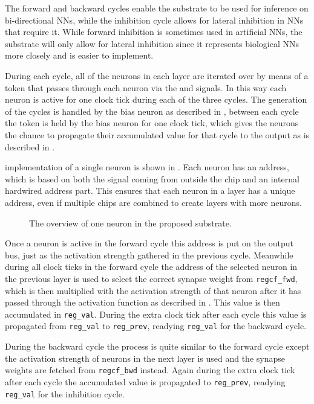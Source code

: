 The forward and backward cycles enable the substrate to be used for inference on bi-directional \acp{NN}, while the inhibition cycle allows for lateral inhibition in \acp{NN} that require it. While forward inhibition is sometimes used in artificial \acp{NN}, the substrate will only allow for lateral inhibition since it represents biological \acp{NN} more closely and is easier to implement.

During each cycle, all of the neurons in each layer are iterated over by means of a token that passes through each neuron via the  and  signals. In this way each neuron is active for one clock tick during each of the three cycles. The generation of the cycles is handled by the bias neuron as described in , between each cycle the token is held by the bias neuron for one clock tick, which gives the neurons the chance to propagate their accumulated value for that cycle to the output as is described in .

 implementation of a single neuron is shown in . Each neuron has an address, which is based on both the  signal coming from outside the chip and an internal hardwired address part. This ensures that each neuron in a layer has a unique address, even if multiple chips are combined to create layers with more neurons.

\begin{figure*}[!ht]
  \centering
  
  \caption{The overview of one neuron in the proposed substrate.}
  \label{fig:neuron}
\end{figure*}

Once a neuron is active in the forward cycle this address is put on the output bus, just as the activation strength gathered in the previous cycle. Meanwhile during all clock ticks in the forward cycle the address of the selected neuron in the previous layer is used to select the correct synapse weight from \texttt{regcf\_fwd}, which is then multiplied with the activation strength of that neuron after it has passed through the activation function as described in . This value is then accumulated in \texttt{reg\_val}. During the extra clock tick after each cycle this value is propagated from \texttt{reg\_val} to \texttt{reg\_prev}, readying \texttt{reg\_val} for the backward cycle.

During the backward cycle the process is quite similar to the forward cycle except the activation strength of neurons in the next layer is used and the synapse weights are fetched from \texttt{regcf\_bwd} instead. Again during the extra clock tick after each cycle the accumulated value is propagated to \texttt{reg\_prev}, readying \texttt{reg\_val} for the inhibition cycle.

